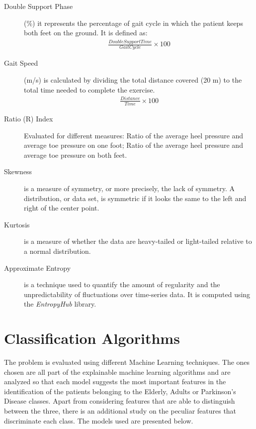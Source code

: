 \begin{description}
\item[Double Support Phase] (\%) it represents the percentage of gait cycle in which the patient keeps both feet on the ground. It is defined as:
\begin{equation}
\begin{aligned}
\frac{Double Support Time}{Gait Cycle} \times 100
\end{aligned}
\end{equation}

\item[Gait Speed] 
(m/s) is calculated by dividing the total distance covered (20 m) to the total time needed to complete the exercise.
\begin{equation}
\begin{aligned}
\frac{Distance}{Time} \times 100
\end{aligned}
\end{equation}

\item[Ratio (R) Index] Evaluated for different measures: Ratio of the average heel pressure and average toe pressure on one foot; Ratio of the average heel pressure and average toe pressure on both feet.

\item[Skewness] is a measure of symmetry, or more precisely, the lack of symmetry. A distribution, or data set, is symmetric if it looks the same to the left and right of the center point.

\item[Kurtosis]  is a measure of whether the data are heavy-tailed or light-tailed relative to a normal distribution. 

\item[Approximate Entropy]  is a technique used to quantify the amount of regularity and the unpredictability of fluctuations over time-series data. It is computed using the \textit{EntropyHub} library.

\end{description}




\section{Classification Algorithms}

The problem is evaluated using different Machine Learning techniques. The ones chosen are all part of the explainable machine learning algorithms and 
are analyzed so that each model suggests the most important features in the identification of the patients belonging to the Elderly, Adults or Parkinson's Disease classes.
Apart from considering features that are able to distinguish between the three, there is an additional study on the peculiar features that discriminate each class.
The models used are presented below.

